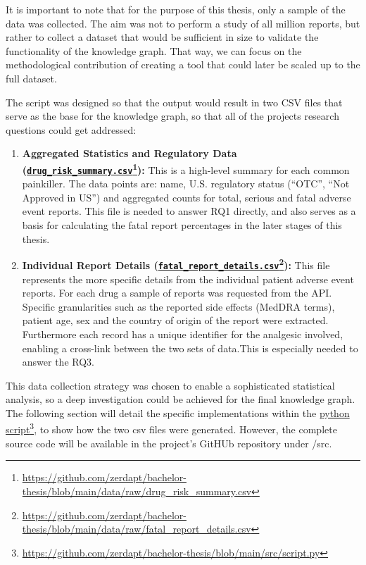It is important to note that for the purpose of this thesis, only a sample of the data was collected. The aim was not to perform a study of all million reports, but rather to collect a dataset that would be sufficient in size to validate the functionality of the knowledge graph.  That way, we can focus on the methodological contribution of creating a tool that could later be scaled up to the full dataset. 

The script was designed so that the output would result in two CSV files that serve as the base for the knowledge graph, so that all of the projects research questions could get addressed:

\begin{enumerate}
    \item \textbf{Aggregated Statistics and Regulatory Data (\href{https://github.com/zerdapt/bachelor-thesis/blob/main/data/raw/drug_risk_summary.csv}{\nolinkurl{drug_risk_summary.csv}}\footnote{\url{https://github.com/zerdapt/bachelor-thesis/blob/main/data/raw/drug_risk_summary.csv}}):} This is a high-level summary for each common painkiller. The data points are: name, U.S. regulatory status (“OTC”, “Not Approved in US”) and aggregated counts for total, serious and fatal adverse event reports. This file is needed to answer RQ1 directly, and also serves as a basis for calculating the fatal report percentages in the later stages of this thesis.
    \item \textbf{Individual Report Details (\href{https://github.com/zerdapt/bachelor-thesis/blob/main/data/raw/fatal_report_details.csv}{\nolinkurl{fatal_report_details.csv}}\footnote{\url{https://github.com/zerdapt/bachelor-thesis/blob/main/data/raw/fatal_report_details.csv}}):} This file represents the more specific details from the individual patient adverse event reports. For each drug a sample of reports was requested from the API. Specific granularities such as the reported side effects (MedDRA terms), patient age, sex and the country of origin of the report were extracted. Furthermore each record has a unique identifier for the analgesic involved, enabling a cross-link between the two sets of data.This is especially needed to answer the RQ3.
\end{enumerate}
This data collection strategy was chosen to enable a sophisticated statistical analysis, so a deep investigation could be achieved for the final knowledge graph. The following section will detail the specific implementations within the \href{https://github.com/zerdapt/bachelor-thesis/blob/main/src/script.py}{python script}\footnote{\url{https://github.com/zerdapt/bachelor-thesis/blob/main/src/script.py}}, to show how the two csv files were generated. However, the complete source code will be available in the project's GitHUb repository under /src. 

